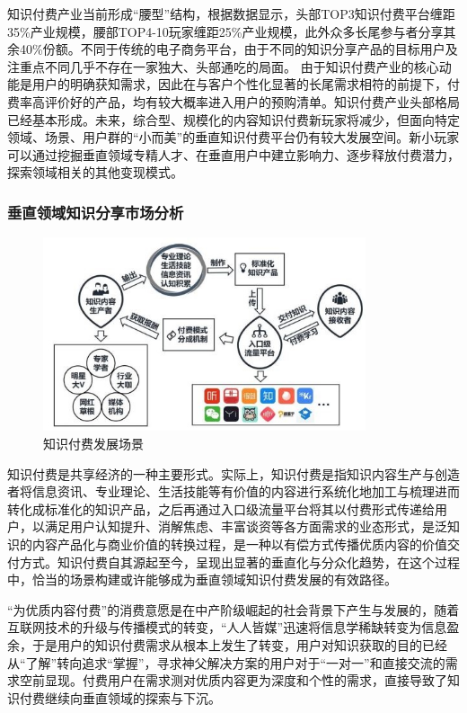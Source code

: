 \documentclass[UTF8,12pt]{ctexart}
\numberwithin{figure}{section}%
\begin{document}
\begin{spacing}{2}
知识付费产业当前形成“腰型”结构，根据数据显示，头部TOP3知识付费平台缠距35\%产业规模，腰部TOP4-10玩家缠距25\%产业规模，此外众多长尾参与者分享其余40\%份额。不同于传统的电子商务平台，由于不同的知识分享产品的目标用户及注重点不同几乎不存在一家独大、头部通吃的局面。
由于知识付费产业的核心动能是用户的明确获知需求，因此在与客户个性化显著的长尾需求相符的前提下，付费率高评价好的产品，均有较大概率进入用户的预购清单。知识付费产业头部格局已经基本形成。未来，综合型、规模化的内容知识付费新玩家将减少，但面向特定领域、场景、用户群的“小而美”的垂直知识付费平台仍有较大发展空间。新小玩家可以通过挖掘垂直领域专精人才、在垂直用户中建立影响力、逐步释放付费潜力，探索领域相关的其他变现模式。

\subsubsection{垂直领域知识分享市场分析}

\begin{figure}[!htb]
	\centering
	\includegraphics[width=9.5cm]{fig/4}
	\caption{知识付费发展场景}
\end{figure}

知识付费是共享经济的一种主要形式。实际上，知识付费是指知识内容生产与创造者将信息资讯、专业理论、生活技能等有价值的内容进行系统化地加工与梳理进而转化成标准化的知识产品，之后再通过入口级流量平台将其以付费形式传递给用户，以满足用户认知提升、消解焦虑、丰富谈资等各方面需求的业态形式，是泛知识的内容产品化与商业价值的转换过程，是一种以有偿方式传播优质内容的价值交付方式。知识付费自其源起至今，呈现出显著的垂直化与分众化趋势，在这个过程中，恰当的场景构建或许能够成为垂直领域知识付费发展的有效路径。

“为优质内容付费”的消费意愿是在中产阶级崛起的社会背景下产生与发展的，随着互联网技术的升级与传播模式的转变，“人人皆媒”迅速将信息学稀缺转变为信息盈余，于是用户的知识付费需求从根本上发生了转变，用户对知识获取的目的已经从“了解”转向追求“掌握”，寻求神父解决方案的用户对于“一对一”和直接交流的需求空前显现。付费用户在需求测对优质内容更为深度和个性的需求，直接导致了知识付费继续向垂直领域的探索与下沉。




\end{spacing}
\end{document}
